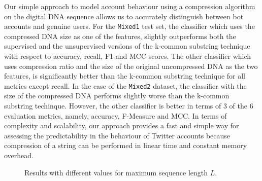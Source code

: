 \documentclass{llncs}
\begin{document}
Our simple approach to model account behaviour using a compression algorithm on the digital DNA sequence allows us to accurately distinguish between bot accounts and genuine users. For the \texttt{Mixed1} test set, the classifier which uses the compressed DNA size as one of the features, slightly outperforms both the supervised and the unsupervised versions of the k-common substring technique with respect to accuracy, recall, F1 and MCC scores. The other classifier which uses compression ratio and the size of the original uncompressed DNA as the two features, is significantly better than the k-common substring technique for all metrics except recall. In the case of the \texttt{Mixed2} dataset, the classifier with the size of the compressed DNA performs slightly worse than the k-common substring techinque. However, the other classifier is better in terms of 3 of the 6 evaluation metrics, namely, accuracy, F-Measure and MCC. In terms of complexity and scalability, our approach provides a fast and simple way for assessing the predictability in the behaviour of Twitter accounts because compression of a string can be performed in linear time and constant memory overhead.

\begin{figure}
    \centering
    \qquad
    \caption{Results with different values for maximum sequence length $L$.}
    \label{fig:eval_seq_len}
\end{figure}
\end{document}
